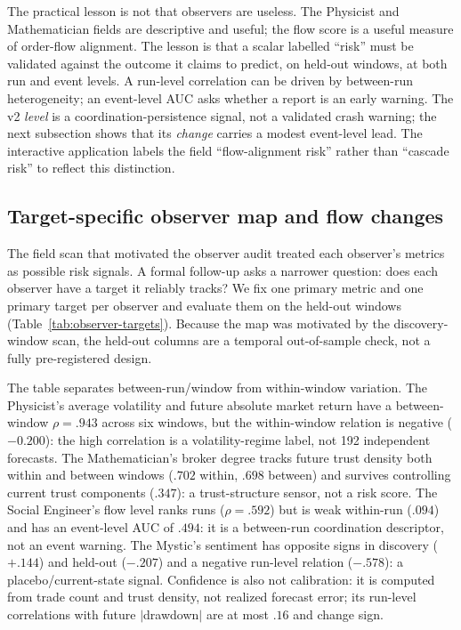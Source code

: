 \documentclass[11pt]{article}
\begin{document}
The practical lesson is not that observers are useless. The Physicist and
Mathematician fields are descriptive and useful; the flow score is a useful
measure of order-flow alignment. The lesson is that a scalar labelled ``risk''
must be validated against the outcome it claims to predict, on held-out windows,
at both run and event levels. A run-level correlation can be driven by
between-run heterogeneity; an event-level AUC asks whether a report is an early
warning. The v2 \emph{level} is a coordination-persistence signal, not a validated
crash warning; the next subsection shows that its \emph{change} carries a modest
event-level lead. The interactive application labels the field ``flow-alignment
risk'' rather than ``cascade risk'' to reflect this distinction.

\subsection{Target-specific observer map and flow changes}

The field scan that motivated the observer audit treated each observer's metrics
as possible risk signals. A formal follow-up asks a narrower question: does each
observer have a target it reliably tracks? We fix one primary metric and one
primary target per observer and evaluate them on the held-out windows
(Table~\ref{tab:observer-targets}). Because the map was motivated by the
discovery-window scan, the held-out columns are a temporal out-of-sample check,
not a fully pre-registered design.

The table separates between-run/window from within-window variation. The
Physicist's average volatility and future absolute market return have a
between-window $\rho=.943$ across six windows, but the within-window relation is
negative ($-0.200$): the high correlation is a volatility-regime label, not 192
independent forecasts. The Mathematician's broker degree tracks future trust
density both within and between windows ($.702$ within, $.698$ between) and
survives controlling current trust components ($.347$): a trust-structure sensor,
not a risk score. The Social Engineer's flow level ranks runs ($\rho=.592$) but
is weak within-run ($.094$) and has an event-level AUC of $.494$: it is a
between-run coordination descriptor, not an event warning. The Mystic's sentiment
has opposite signs in discovery ($+.144$) and held-out ($-.207$) and a negative
run-level relation ($-.578$): a placebo/current-state signal. Confidence is also
not calibration: it is computed from trade count and trust density, not realized
forecast error; its run-level correlations with future $|$drawdown$|$ are at most
$.16$ and change sign.
\end{document}
